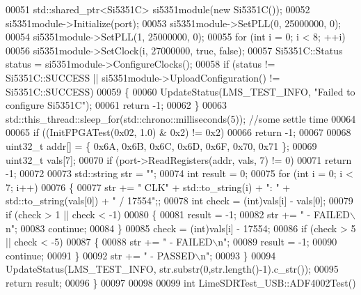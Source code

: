 \begin{DoxyCode}
00051     std::shared\_ptr<Si5351C> si5351module(\textcolor{keyword}{new} Si5351C());
00052     si5351module->Initialize(port);
00053     si5351module->SetPLL(0, 25000000, 0);
00054     si5351module->SetPLL(1, 25000000, 0);
00055     \textcolor{keywordflow}{for} (\textcolor{keywordtype}{int} i = 0; i < 8; ++i)
00056         si5351module->SetClock(i, 27000000, \textcolor{keyword}{true}, \textcolor{keyword}{false});
00057     Si5351C::Status status = si5351module->ConfigureClocks();
00058     \textcolor{keywordflow}{if} (status != Si5351C::SUCCESS || si5351module->UploadConfiguration() != 
      Si5351C::SUCCESS)
00059     \{
00060         UpdateStatus(LMS_TEST_INFO, \textcolor{stringliteral}{"Failed to configure Si5351C"});
00061         \textcolor{keywordflow}{return} -1;
00062     \}
00063     std::this\_thread::sleep\_for(std::chrono::milliseconds(5)); \textcolor{comment}{//some settle time}
00064 
00065     \textcolor{keywordflow}{if} ((InitFPGATest(0x02, 1.0) & 0x2) != 0x2)
00066         \textcolor{keywordflow}{return} -1;
00067 
00068     uint32\_t addr[] = \{ 0x6A, 0x6B, 0x6C, 0x6D, 0x6F, 0x70, 0x71 \};
00069     uint32\_t vals[7];
00070     \textcolor{keywordflow}{if} (port->ReadRegisters(addr, vals, 7) != 0)
00071         \textcolor{keywordflow}{return} -1;
00072 
00073     std::string str = \textcolor{stringliteral}{""};
00074     \textcolor{keywordtype}{int} result = 0;
00075     \textcolor{keywordflow}{for} (\textcolor{keywordtype}{int} i = 0; i < 7; i++)
00076     \{
00077         str += \textcolor{stringliteral}{"  CLK"} + std::to\_string(i) + \textcolor{stringliteral}{": "} + std::to\_string(vals[0]) + \textcolor{stringliteral}{" / 17554"};;
00078         \textcolor{keywordtype}{int} check = (int)vals[i] - vals[0];
00079         \textcolor{keywordflow}{if} (check > 1 || check < -1)
00080         \{
00081             result = -1;
00082             str += \textcolor{stringliteral}{" - FAILED\(\backslash\)n"};
00083             \textcolor{keywordflow}{continue};
00084         \}
00085         check = (int)vals[i] - 17554;
00086         \textcolor{keywordflow}{if} (check > 5 || check < -5)
00087         \{
00088             str += \textcolor{stringliteral}{" - FAILED\(\backslash\)n"};
00089             result = -1;
00090             \textcolor{keywordflow}{continue};
00091         \}
00092         str += \textcolor{stringliteral}{" - PASSED\(\backslash\)n"};
00093     \}
00094     UpdateStatus(LMS_TEST_INFO, str.substr(0,str.length()-1).c\_str());
00095     \textcolor{keywordflow}{return} result;
00096 \}
00097 
00098 
00099 \textcolor{keywordtype}{int} LimeSDRTest_USB::ADF4002Test()

\end{DoxyCode}
